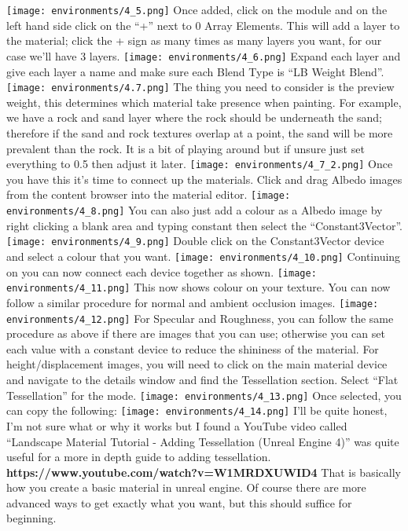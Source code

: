\documentclass[../main.tex]{subfiles}
\begin{document}
\texttt{[image: environments/4\_5.png]}
Once added, click on the module and on the left hand side click on the “+” next to 0 Array Elements. This will add a layer to the material; click the + sign as many times as many layers you want, for our case we’ll have 3 layers.
\texttt{[image: environments/4\_6.png]}
Expand each layer and give each layer a name and make sure each Blend Type is “LB Weight Blend”.
\texttt{[image: environments/4.7.png]}
The thing you need to consider is the preview weight, this determines which material take presence when painting. For example, we have a rock and sand layer where the rock should be underneath the sand; therefore if the sand and rock textures overlap at a point, the sand will be more prevalent than the rock.
It is a bit of playing around but if unsure just set everything to 0.5 then adjust it later.
\texttt{[image: environments/4\_7\_2.png]}
Once you have this it’s time to connect up the materials.
Click and drag Albedo images from the content browser into the material editor.
\texttt{[image: environments/4\_8.png]}
You can also just add a colour as a Albedo image by right clicking a blank area and typing constant then select the “Constant3Vector”.
\texttt{[image: environments/4\_9.png]}
Double click on the Constant3Vector device and select a colour that you want.
\texttt{[image: environments/4\_10.png]}
Continuing on you can now connect each device together as shown.
\texttt{[image: environments/4\_11.png]}
This now shows colour on your texture. You can now follow a similar procedure for normal and ambient occlusion images.
\texttt{[image: environments/4\_12.png]}
For Specular and Roughness, you can follow the same procedure as above if there are images that you can use; otherwise you can set each value with a constant device to reduce the shininess of the material.
For height/displacement images, you will need to click on the main material device and navigate to the details window and find the Tessellation section. Select “Flat Tessellation” for the mode.
 \texttt{[image: environments/4\_13.png]}
Once selected, you can copy the following:
\texttt{[image: environments/4\_14.png]}
I’ll be quite honest, I’m not sure what or why it works but I found a YouTube video called “Landscape Material Tutorial - Adding Tessellation (Unreal Engine 4)” was quite useful for a more in depth guide to adding tessellation.
\textbf{https://www.youtube.com/watch?v=W1MRDXUWID4}
That is basically how you create a basic material in unreal engine. Of course there are more advanced ways to get exactly what you want, but this should suffice for beginning.
\end{document}
